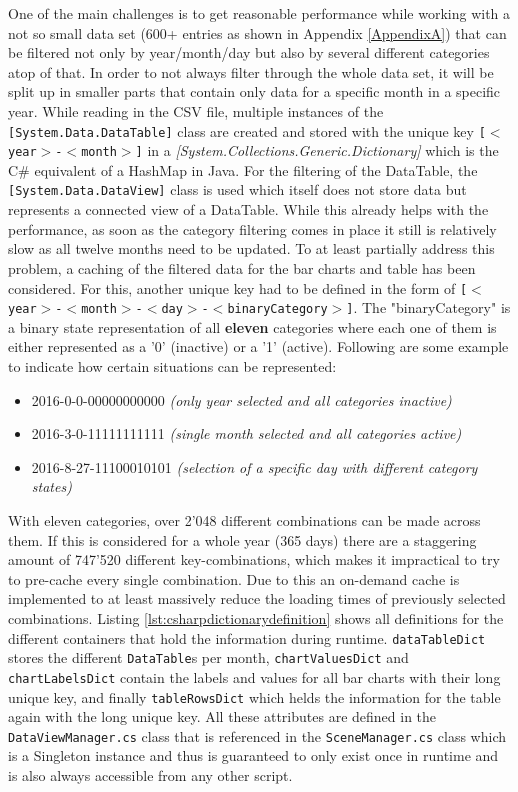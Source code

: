 One of the main challenges is to get reasonable performance while working with a not so small data set (600+ entries as shown in Appendix \ref{AppendixA}) that can be filtered not only by year/month/day but also by several different categories atop of that. In order to not always filter through the whole data set, it will be split up in smaller parts that contain only data for a specific month in a specific year. While reading in the CSV file, multiple instances of the \texttt{[System.Data.DataTable]} class are created and stored with the unique key \texttt{[$<$year$>$-$<$month$>$]} in a \textit{[System.Collections.Generic.Dictionary]} which is the C\# equivalent of a HashMap in Java. For the filtering of the DataTable, the \texttt{[System.Data.DataView]} class is used which itself does not store data but represents a connected view of a DataTable. While this already helps with the performance, as soon as the category filtering comes in place it still is relatively slow as all twelve months need to be updated. \newline
To at least partially address this problem, a caching of the filtered data for the bar charts and table has been considered. For this, another unique key had to be defined in the form of \texttt{[$<$year$>$-$<$month$>$-$<$day$>$-$<$binaryCategory$>$]}. The "binaryCategory" is a binary state representation of all \textbf{eleven} categories where each one of them is either represented as a '0' (inactive) or a '1' (active). Following are some example to indicate how certain situations can be represented:
\begin{itemize}[noitemsep,nolistsep]
	\item 2016-0-0-00000000000 \textit{(only year selected and all categories inactive)}
	\item 2016-3-0-11111111111 \textit{(single month selected and all categories active)}
	\item 2016-8-27-11100010101 \textit{(selection of a specific day with different category states)}
\end{itemize}
With eleven categories, over 2'048 different combinations can be made across them. If this is considered for a whole year (365 days) there are a staggering amount of 747'520 different key-combinations, which makes it impractical to try to pre-cache every single combination. Due to this an on-demand cache is implemented to at least massively reduce the loading times of previously selected combinations. Listing \ref{lst:csharpdictionarydefinition} shows all definitions for the different containers that hold the information during runtime. \texttt{dataTableDict} stores the different \texttt{DataTable}s per month, \texttt{chartValuesDict} and \texttt{chartLabelsDict} contain the labels and values for all bar charts with their long unique key, and finally \texttt{tableRowsDict} which helds the information for the table again with the long unique key. All these attributes are defined in the \texttt{DataViewManager.cs} class that is referenced in the \texttt{SceneManager.cs} class which is a Singleton instance and thus is guaranteed to only exist once in runtime and is also always accessible from any other script.
